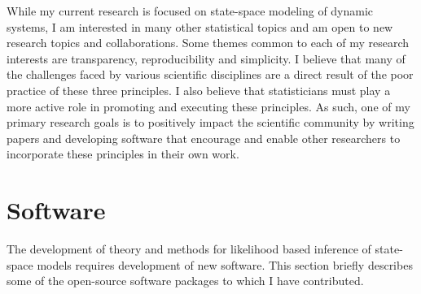 \documentclass{article}
\begin{document}
While my current research is focused on state-space modeling of dynamic systems, I am interested in many other statistical topics and am open to new research topics and collaborations.
Some themes common to each of my research interests are transparency, reproducibility and simplicity.
I believe that many of the challenges faced by various scientific disciplines are a direct result of the poor practice of these three principles.
I also believe that statisticians must play a more active role in promoting and executing these principles.
As such, one of my primary research goals is to positively impact the scientific community by writing papers and developing software that encourage and enable other researchers to incorporate these principles in their own work.

\section{Software}\label{sec:software}

The development of theory and methods for likelihood based inference of state-space models requires development of new software.
This section briefly describes some of the open-source software packages to which I have contributed.
\end{document}
